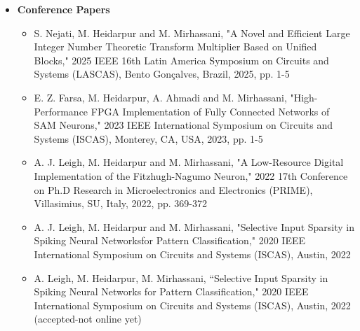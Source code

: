 \begin {itemize}
\begin {itemize}
\begin {itemize}
                    \vspace{0.3cm}
                     \item [-]   M. Heidarpur, A.~Ahmadi, N.~Kandalaft,``An Efficient Digital Implementation of 2D Hindmarsh-Rose Neuron", Nonlinear Dynamics, vol. 89, no. 3, pp. 1–14, Aug
                     \vspace{0.3cm}
                \end {itemize} \vspace{0.3cm}
         \item [$\bullet$] \bf {\mtf \normalsize Conference Papers} \mdseries
                \begin {itemize}
                	    \item [-] S. Nejati, M. Heidarpur and M. Mirhassani, "A Novel and Efficient Large Integer Number Theoretic Transform Multiplier Based on Unified Blocks," 2025 IEEE 16th Latin America Symposium on Circuits and Systems (LASCAS), Bento Gonçalves, Brazil, 2025, pp. 1-5
                    \vspace{0.3cm}
                    \item [-]  E. Z. Farsa, M. Heidarpur, A. Ahmadi and M. Mirhassani, "High-Performance FPGA Implementation of Fully Connected Networks of SAM Neurons," 2023 IEEE International Symposium on Circuits and Systems (ISCAS), Monterey, CA, USA, 2023, pp. 1-5
                    \vspace{0.3cm}
                    \item [-]  A. J. Leigh, M. Heidarpur and M. Mirhassani, "A Low-Resource Digital Implementation of the Fitzhugh-Nagumo Neuron," 2022 17th Conference on Ph.D Research in Microelectronics and Electronics (PRIME), Villasimius, SU, Italy, 2022, pp. 369-372
                    \vspace{0.3cm}
                    \item [-]  A. J. Leigh, M. Heidarpur and M. Mirhassani, "Selective Input Sparsity in Spiking Neural Networksfor Pattern Classification," 2020 IEEE International Symposium on Circuits and Systems (ISCAS), Austin, 2022
                    \vspace{0.3cm}
                    \item [-]  A. Leigh, M. Heidarpur, M. Mirhassani, ``Selective Input Sparsity in Spiking Neural Networks for Pattern Classification," 2020 IEEE International Symposium on Circuits and Systems (ISCAS), Austin, 2022 (accepted-not online yet)
                    \vspace{0.3cm}

\end{itemize}
\end{itemize}
\end{itemize}
